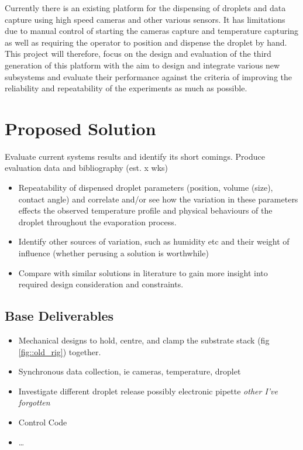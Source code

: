 \documentclass[11pt, a4paper, twoside, openright]{report}
\begin{document}
Currently there is an existing platform for the dispensing of droplets and data capture using high speed cameras and other various sensors. It has limitations due to manual control of starting the cameras capture and temperature capturing as well as requiring the operator to position and dispense the droplet by hand. \\

This project will therefore, focus on the design and evaluation of the third generation of this platform with the aim to design and integrate various new subsystems and evaluate their performance against the criteria of improving the reliability and repeatability of the experiments as much as possible.

\section{Proposed Solution}

Evaluate current systems results and identify its short comings. Produce evaluation data and bibliography (est. x wks)
\begin{itemize}
  \item Repeatability of dispensed droplet parameters (position, volume (size), contact angle) and correlate and/or see how the variation in these parameters effects the observed temperature profile and physical behaviours of the droplet throughout the evaporation process.
  \item Identify other sources of variation, such as humidity etc and their weight of influence (whether perusing a solution is worthwhile)
  \item Compare with similar solutions in literature to gain more insight into required design consideration and constraints.
\end{itemize}



\subsection{Base Deliverables}
\begin{itemize}
  \item Mechanical designs to hold, centre, and clamp the substrate stack (fig \ref{fig::old_rig}) together.
  \item Synchronous data collection, ie cameras, temperature, droplet
  \item Investigate different droplet release possibly electronic pipette \textit{other I've forgotten}
  \item Control Code
  \item \dots
\end{itemize}
\end{document}
